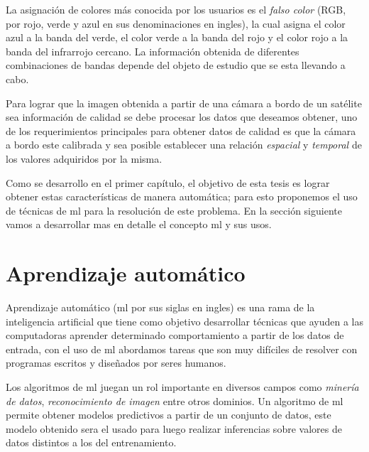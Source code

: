 La asignación de colores más conocida por los usuarios es el \textit{falso color} (RGB, por rojo, verde y azul en sus denominaciones en ingles), la cual asigna el color azul a la banda del verde, el color verde a la banda del rojo y el color rojo a la banda del infrarrojo cercano. La información obtenida de diferentes combinaciones de bandas depende del objeto de estudio que se esta llevando a cabo.


Para lograr que la imagen obtenida a partir de una cámara a bordo de un satélite sea información de calidad se debe procesar los datos que deseamos obtener, uno de los requerimientos principales para obtener datos de calidad es que la cámara a bordo este calibrada y sea posible establecer una relación \textit{espacial} y \textit{temporal} de los valores adquiridos por la misma.

Como se desarrollo en el primer capítulo, el objetivo de esta tesis es lograr obtener estas características de manera automática; para esto proponemos el uso de técnicas de \ac{ml} para la resolución de este problema. En la sección siguiente vamos a desarrollar mas en detalle  el concepto \ac{ml} y sus usos.




\section{Aprendizaje automático}\label{sec:machinelaerning}

Aprendizaje automático (\ac{ml} por sus siglas en ingles) es una rama de la inteligencia artificial que tiene como objetivo desarrollar técnicas que ayuden a las computadoras aprender determinado comportamiento a partir de los datos de entrada, con el uso de \ac{ml} abordamos tareas que son muy difíciles de resolver con programas escritos y diseñados por seres humanos.

Los algoritmos de \ac{ml} juegan un rol importante en diversos campos como \textit{minería de datos}, \textit{reconocimiento de imagen} entre otros dominios. Un algoritmo de  \ac{ml} permite obtener modelos predictivos a partir de un conjunto de datos, este modelo obtenido sera el usado para luego realizar inferencias sobre valores de datos distintos a los del entrenamiento.

